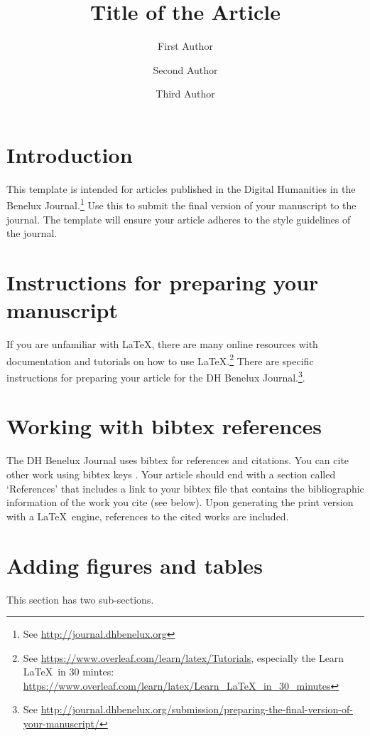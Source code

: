 \documentclass{dhbenelux}
\author[1]{First Author}
\author[2]{Second Author}
\author[2]{Third Author}
\affil[1]{First author's affiliation}
\affil[2]{Second and third authors' affiliation}
\title{Title of the Article}
\begin{document}
\maketitle
\thispagestyle{papertitlepage} 

\section{Introduction}

This template is intended for articles published in the Digital Humanities in the Benelux Journal.\footnote{See \url{http://journal.dhbenelux.org}} Use this to submit the final version of your manuscript to the journal. The template will ensure your article adheres to the style guidelines of the journal. 

\section{Instructions for preparing your manuscript}

If you are unfamiliar with \LaTeX, there are many online resources with documentation and tutorials on how to use \LaTeX.\footnote{See \url{https://www.overleaf.com/learn/latex/Tutorials}, especially the Learn \LaTeX\ in 30 mintes: \url{https://www.overleaf.com/learn/latex/Learn_LaTeX_in_30_minutes}} 
%
There are specific instructions for preparing your article for the DH Benelux Journal.\footnote{See \url{http://journal.dhbenelux.org/submission/preparing-the-final-version-of-your-manuscript/}}.


\section{Working with bibtex references}

The DH Benelux Journal uses bibtex for references and citations. You can cite other work using bibtex keys \citet{maxwell2013qualitative}. Your article should end with a section called `References' that includes a link to your bibtex file that contains the bibliographic information of the work you cite (see below). Upon generating the print version with a \LaTeX\ engine, references to the cited works are included. 

\section{Adding figures and tables}

This section has two sub-sections.
\end{document}
